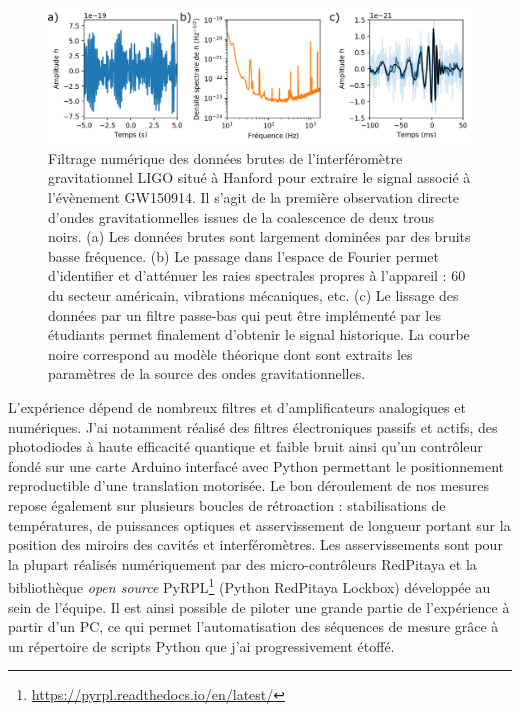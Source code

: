 \documentclass[12pt,a4paper]{article}
\begin{document}
\begin{figure}
\center
\includegraphics[scale=0.75]{figures/GW150914_data_abc_small.png}
\caption{Filtrage numérique des données brutes de l'interféromètre gravitationnel LIGO situé à Hanford pour extraire le signal associé à l'évènement GW150914.
Il s'agit de la première observation directe d'ondes gravitationnelles issues de la coalescence de deux trous noirs.
(a) Les données brutes sont largement dominées par des bruits basse fréquence.
(b) Le passage dans l'espace de Fourier permet d'identifier et d'atténuer les raies spectrales propres à l'appareil : \unit{60}{\hertz} du secteur américain, vibrations mécaniques, etc.
(c) Le lissage des données par un filtre passe-bas qui peut être implémenté par les étudiants permet finalement d'obtenir le signal historique.
La courbe noire correspond au modèle théorique dont sont extraits les paramètres de la source des ondes gravitationnelles.}
\label{fig:GW150914}
\end{figure}

L'expérience dépend de nombreux filtres et d'amplificateurs analogiques et numériques.
J'ai notamment réalisé des filtres électroniques passifs et actifs, des photodiodes à haute efficacité quantique et faible bruit ainsi qu'un contrôleur fondé sur une carte Arduino interfacé avec Python permettant le positionnement reproductible d'une translation motorisée.
Le bon déroulement de nos mesures repose également sur plusieurs boucles de rétroaction : stabilisations de températures, de puissances optiques et asservissement de longueur portant sur la position des miroirs des cavités et interféromètres.
Les asservissements sont pour la plupart réalisés numériquement par des micro-contrôleurs RedPitaya et la bibliothèque \textit{open source} PyRPL\footnote{\url{https://pyrpl.readthedocs.io/en/latest/}} (Python RedPitaya Lockbox) développée au sein de l'équipe.
Il est ainsi possible de piloter une grande partie de l'expérience à partir d'un PC, ce qui permet l'automatisation des séquences de mesure grâce à un répertoire de scripts Python que j'ai progressivement étoffé.
\end{document}
